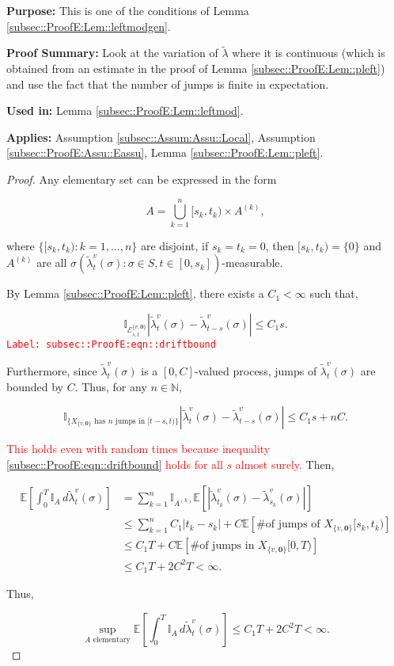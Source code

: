 \documentclass[12pt]{article}
\newcommand{\mb}{\mathbb}
\newcommand{\mc}{\mathcal}
\newcommand{\te}{\text}
\newcommand{\tr}{\textcolor{red}}
\newcommand{\labe}[1]{\tr{\texttt{Label: #1}}}
\newcommand{\purpose}{\textbf{Purpose: }}
\newcommand{\pfsum}{\textbf{Proof Summary: }}
\newcommand{\usein}{\textbf{Used in: }}
\newcommand{\app}{\textbf{Applies: }}
\newcommand{\ex}[1]{\mb{E}\left[#1\right]}			%
\renewcommand{\root}{\mathbf{0}}				%
\renewcommand{\v}{v}							%
\renewcommand{\S}{S}							%
\newcommand{\s}{\sigma}							%
\newcommand{\T}{T}								%
\renewcommand{\t}{t}							%
\renewcommand{\tt}{s}							%
\newcommand{\X}{X}								%
\newcommand{\vind}[1]{^{#1}}					%
\newcommand{\cind}[1]{_{#1}}					%
\newcommand{\tip}[1]{#1}						%
\newcommand{\ts}[1]{_{#1}}						%
\newcommand{\const}{C}							%
\newcommand{\sln}[1]{^{(#1)}}					%
\newcommand{\alt}[1]{\widetilde{#1}}			%
\newcommand{\indx}[1]{_{#1}}					%
\renewcommand{\it}{k}							%
\newcommand{\evnt}{\mc{E}}						%
\newcommand{\typset}{A}							%
\newcommand{\crate}{\alt{\lambda}}				%
\begin{document}
\purpose This is one of the conditions of Lemma \ref{subsec::ProofE:Lem::leftmodgen}.

\pfsum Look at the variation of \(\crate\) where it is continuous (which is obtained from an estimate in the proof of Lemma \ref{subsec::ProofE:Lem::pleft}) and use the fact that the number of jumps is finite in expectation.

\usein Lemma \ref{subsec::ProofE:Lem::leftmod}.

\app Assumption \ref{subsec::Assum:Assu::Local}, Assumption \ref{subsec::ProofE:Assu::Eassu}, Lemma \ref{subsec::ProofE:Lem::pleft}.

\begin{proof}
Any elementary set can be expressed in the form

\[\typset = \bigcup_{\it = 1}^n [\tt\indx{\it},\t\indx{\it})\times \typset\sln{\it},\]

where \(\{[\tt\indx{\it},\t\indx{\it}):\it=1,\dots,n\}\) are disjoint, if \(\tt\indx{\it} = \t\indx{\it} = 0\), then \([\tt\indx{\it},\t\indx{\it}) = \{0\}\) and \(\typset\sln{\it}\) are all \(\sigma(\crate\vind{\v}\ts{\t}(\s):\s \in \S,\t\in [0,\tt\indx{\it}])\)-measurable. 

By Lemma \ref{subsec::ProofE:Lem::pleft}, there exists a \(\const\indx{1} < \infty\) such that,

\begin{equation}
\mb{I}_{\evnt^{\{\v,\root\}}_{\tt,\t}}|\crate\vind{\v}\ts{\t}(\s) - \crate\vind{\v}\ts{\t-\tt}(\s)| \leq \const\indx{1}\tt.
\label{subsec::ProofE:eqn::driftbound}
\end{equation}
\labe{subsec::ProofE:eqn::driftbound}

Furthermore, since \(\crate\vind{\v}\ts{\t}(\s)\) is a \([0,\const]\)-valued process, jumps of \(\crate\vind{\v}\ts{\t}(\s)\) are bounded by \(\const\). Thus, for any \(n \in \mb{N}\),

\[\mb{I}_{\{\X\cind{\{\v,\root\}}\te{ has }n\te{ jumps in } [\t-\tt,\t)\}}|\crate\vind{\v}\ts{\t}(\s) - \crate\vind{\v}\ts{\t-\tt}(\s)|\leq C_1\tt + n \const.\]

\tr{This holds even with random times because inequality \eqref{subsec::ProofE:eqn::driftbound} holds for all \(\tt\) almost surely.} Then,

\begin{align*}
\ex{\int_0^\T \mb{I}_\typset\,d\crate\vind{\v}\ts{\t}(\s)} &= \sum_{\it = 1}^n \mb{I}_{\typset\sln{\it}}\ex{\left|\crate\vind{\v}\ts{\t\indx{k}}(\s) - \crate\vind{\v}\ts{\tt\indx{\it}}(\s)\right|}\\
&\leq \sum_{\it=1}^n \const\indx{1}|\t\indx{\it} - \tt\indx{\it}| + \const\ex{\te{\# of jumps of }\X\cind{\{\v,\root\}}\tip{[\tt\indx{\it},\t\indx{\it})}}\\
&\leq \const\indx{1}\T + \const\ex{\te{\# of jumps in }\X\cind{\{\v,\root\}}\tip{[0,\T)}}\\
&\leq \const\indx{1}\T + 2\const^2\T < \infty.
\end{align*}

Thus,

\[\sup_{\typset\te{ elementary}} \ex{\int_0^\T \mb{I}_\typset\,d\crate\vind{\v}\ts{\t}(\s)} \leq \const\indx{1}\T + 2\const^2\T < \infty.\]
\end{proof}
\end{document}
